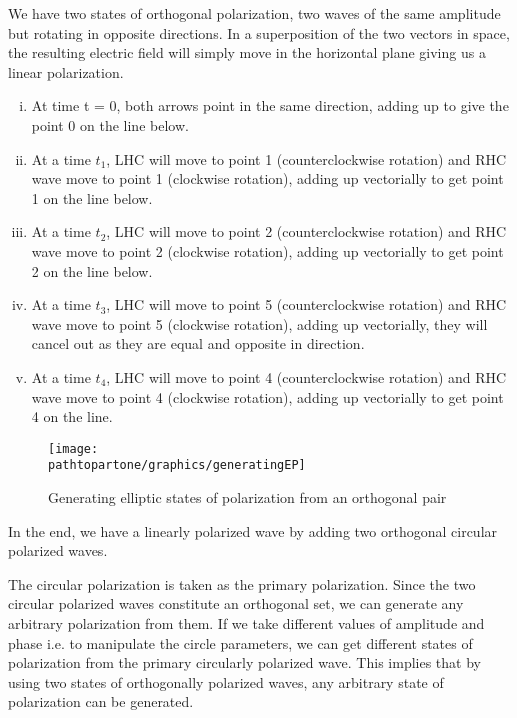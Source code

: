 We have two states of orthogonal polarization, two waves of the same amplitude but rotating in opposite directions. In a superposition of the two vectors in space, the resulting electric field will simply move in the horizontal plane giving us a linear polarization.

\begin{enumerate}[(i)]
\item At time t = 0, both arrows point in the same direction, adding up to give the point 0 on the line below.
\item At a time $ t_{1} $, LHC will move to point 1 (counterclockwise rotation) and RHC wave move to point 1 (clockwise rotation), adding up vectorially to get point 1 on the line below.
\item At a time $ t_{2} $, LHC will move to point 2 (counterclockwise rotation) and RHC wave move to point 2 (clockwise rotation), adding up vectorially to get point 2 on the line below.
\item At a time $ t_{3} $, LHC will move to point 5 (counterclockwise rotation) and RHC wave move to point 5 (clockwise rotation), adding up vectorially, they will cancel out as they are equal and opposite in direction.
\item At a time $ t_{4} $, LHC will move to point 4 (counterclockwise rotation) and RHC wave move to point 4 (clockwise rotation), adding up vectorially to get point 4 on the line.
\end{enumerate}

\begin{figure}[h]
\centering
\texttt{[image: \\pathtopartone/graphics/generatingEP]}
\caption{Generating elliptic states of polarization from an orthogonal pair}
\label{fig:linear-polarized}
\end{figure}

In the end, we have a linearly polarized wave by adding two orthogonal circular polarized waves.

The circular polarization is taken as the primary polarization. Since the two circular polarized waves constitute an orthogonal set, we can generate any arbitrary polarization from them. If we take different values of amplitude and phase i.e. to manipulate the circle parameters, we can get different states of polarization from the primary circularly polarized wave. This implies that by using two states of orthogonally polarized waves, any arbitrary state of polarization can be generated.

